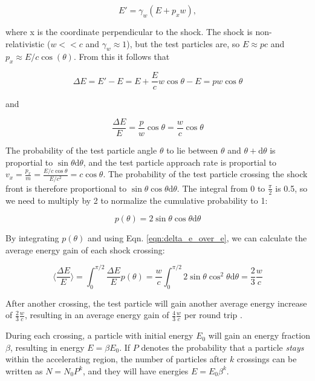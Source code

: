 \documentclass[
    a4paper, %
    fontsize=10pt, %
    twoside=false, %
    numbers=noenddot, %
    fontmethod=tex,
]{kaobook}
\begin{document}
\begin{equation}
    E' = \gamma_{w}(E+p_x w),
\end{equation}

where x is the coordinate perpendicular to the shock. The shock is non-relativistic ($w<<c$ and $\gamma_w\approx1$), but the test particles are, so $E\approx pc$ and $p_x \approx E/c \cos(\theta)$. From this it follows that

\begin{equation}
    \Delta E = E' - E = E+\frac{E}{c}w\cos{\theta}-E = pw\cos{\theta}
\end{equation}

and

\begin{equation}
    \frac{\Delta E}{E} = \frac{p}{w}\cos{\theta} = \frac{w}{c}\cos{\theta}
    \label{eqn:delta_e_over_e}
\end{equation}

The probability of the test particle angle $\theta$ to lie between $\theta$ and $\theta + \text{d}\theta$ is proportial to $\sin{\theta}\text{d}\theta$, and the test particle approach rate is proportial to $v_x = \frac{p_x}{m} = \frac{E/c\cos{\theta}}{E/c^2} = c \cos{\theta}$. The probability of the test particle crossing the shock front is therefore proportional to $\sin{\theta} \cos{\theta} \text{d}\theta$. The integral from 0 to $\frac{\pi}{2}$ is 0.5, so we need to multiply by 2 to normalize the cumulative probability to 1:

\begin{equation}
    p(\theta) = 2\sin{\theta}\cos{\theta} \text{d}\theta
\end{equation}

By integrating $p(\theta)$ and using Eqn. \ref{eqn:delta_e_over_e}, we can calculate the average energy gain of each shock crossing:

\begin{equation}
    \bigg\langle \frac{\Delta E}{E} \bigg\rangle = \int_0^{\pi/2} \frac{\Delta E}{E} p(\theta) = \frac{w}{c} \int_0^{\pi/2} 2 \sin{\theta} \cos^2{\theta}  \text{d}\theta = \frac{2}{3}\frac{w}{c}
\end{equation}

After another crossing, the test particle will gain another average energy increase of $\frac{2}{3}\frac{w}{c}$, resulting in an average energy gain of $\frac{4}{3}\frac{w}{c}$ per round trip \cite{Longair2011}.

During each crossing, a particle with initial energy $E_0$ will gain an energy fraction $\beta$, resulting in energy $E=\beta E_0$. If $P$ denotes the probability that a particle \textit{stays} within the accelerating region, the number of particles after $k$ crossings can be written as $N=N_0 P^k $, and they will have energies $E=E_0\beta^k$.
\end{document}

